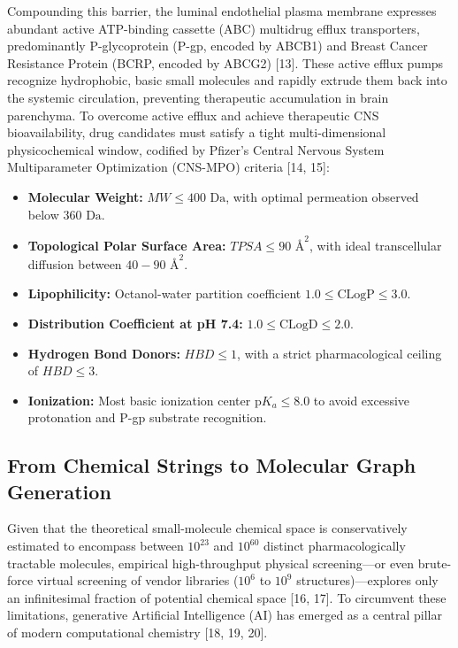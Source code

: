 \documentclass[10pt,a4paper]{article}
\begin{document}
Compounding this barrier, the luminal endothelial plasma membrane expresses abundant active ATP-binding cassette (ABC) multidrug efflux transporters, predominantly P-glycoprotein (P-gp, encoded by ABCB1) and Breast Cancer Resistance Protein (BCRP, encoded by ABCG2) [13]. These active efflux pumps recognize hydrophobic, basic small molecules and rapidly extrude them back into the systemic circulation, preventing therapeutic accumulation in brain parenchyma. To overcome active efflux and achieve therapeutic CNS bioavailability, drug candidates must satisfy a tight multi-dimensional physicochemical window, codified by Pfizer's Central Nervous System Multiparameter Optimization (CNS-MPO) criteria [14, 15]:
\begin{itemize}[noitemsep]
    \item \textbf{Molecular Weight:} $MW \le 400\text{ Da}$, with optimal permeation observed below $360\text{ Da}$.
    \item \textbf{Topological Polar Surface Area:} $TPSA \le 90\text{ \AA}^2$, with ideal transcellular diffusion between $40 - 90\text{ \AA}^2$.
    \item \textbf{Lipophilicity:} Octanol-water partition coefficient $1.0 \le \text{CLogP} \le 3.0$.
    \item \textbf{Distribution Coefficient at pH 7.4:} $1.0 \le \text{CLogD} \le 2.0$.
    \item \textbf{Hydrogen Bond Donors:} $HBD \le 1$, with a strict pharmacological ceiling of $HBD \le 3$.
    \item \textbf{Ionization:} Most basic ionization center $\text{p}K_a \le 8.0$ to avoid excessive protonation and P-gp substrate recognition.
\end{itemize}

\subsection{From Chemical Strings to Molecular Graph Generation}
Given that the theoretical small-molecule chemical space is conservatively estimated to encompass between $10^{23}$ and $10^{60}$ distinct pharmacologically tractable molecules, empirical high-throughput physical screening---or even brute-force virtual screening of vendor libraries ($10^6$ to $10^9$ structures)---explores only an infinitesimal fraction of potential chemical space [16, 17]. To circumvent these limitations, generative Artificial Intelligence (AI) has emerged as a central pillar of modern computational chemistry [18, 19, 20].
\end{document}
